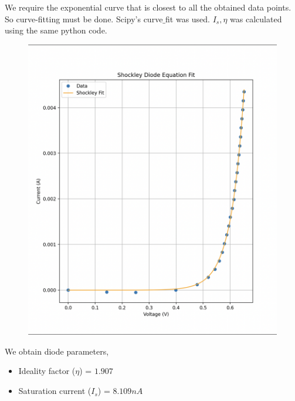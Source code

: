\documentclass[12pt,a4paper]{report}
\begin{document}
\newline We require the exponential curve that is closest to all the obtained data points. So curve-fitting must be done. Scipy's curve$\_$fit was used. $I_s, \eta$ was calculated using the same python code.
\pagebreak
\begin{figure}[h!]
    \centering
    \includegraphics[width=0.7\linewidth]{figs/curve_fit.png}
\end{figure}
\newline We obtain diode parameters,
\begin{itemize}
    \item Ideality factor ($\eta$) = $1.907$
    \item Saturation current ($I_s$) = $8.109nA$
\end{itemize}
\pagebreak
\end{document}
